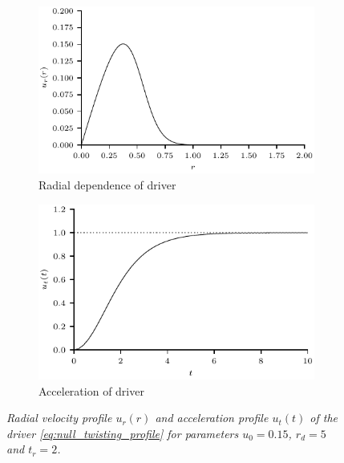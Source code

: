 \documentclass[fleqn,usenatbib]{mnras}
\newcommand{\mycaption}[2]{\caption[#1]{\emph{#1} #2}}
\begin{document}
\begin{figure}
  \centering
  \begin{subfigure}{.49\textwidth}
  \centering
  \includegraphics[width=1.0\linewidth]{u_r.pdf}
  \caption{Radial dependence of driver}
  \label{fig:kink_radial_driver}
  \end{subfigure}
  \begin{subfigure}{.49\textwidth}
  \centering
  \includegraphics[width=1.0\linewidth]{u_t.pdf}
  \caption{Acceleration of driver}
  \label{fig:kink_driver_accel}
  \end{subfigure}
  \mycaption{Radial velocity profile $u_r(r)$ and acceleration profile
    $u_t(t)$ of the driver \eqref{eq:null_twisting_profile} for
    parameters $u_0 = 0.15$, $r_d = 5$ and $t_r = 2$.}{}
  \label{fig:kink_driver}
\end{figure}
\end{document}
